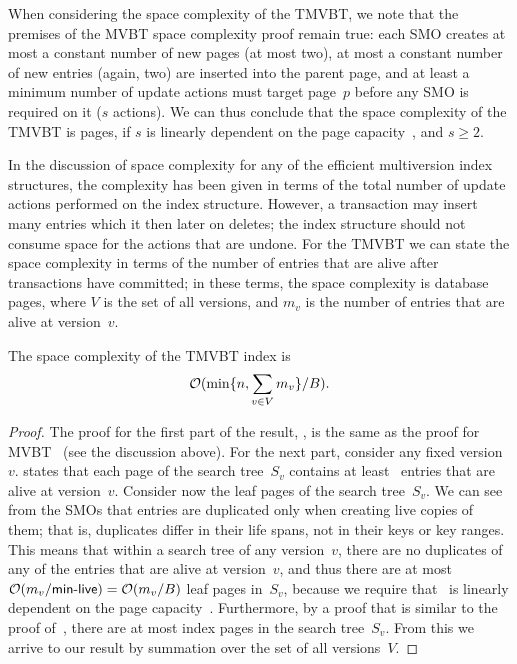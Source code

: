When considering the space complexity of the TMVBT, we note that the premises
of the MVBT space complexity proof remain true: 
each SMO creates at most a constant number of new pages (at most two), 
at most a constant number of new entries (again, two) are inserted into the
parent page, and 
at least a minimum number of update actions must target page~$p$ before any
SMO is required on it ($s$ actions).
We can thus conclude that the space complexity of the TMVBT is 
 pages, if $s$ is linearly dependent on the page
capacity~\capacity, and $s \geq 2$.

In the discussion of space complexity for any of the efficient
multiversion index structures, the complexity has been given in terms of the
total number of update actions performed on the index structure. 
However, a transaction may insert many entries which it then later on deletes;
the index structure should not consume space for the actions that are undone.
For the TMVBT we can state the space complexity in terms of the number of
entries that are alive after transactions have committed; in these terms, the
space complexity is  database pages,
where $V$ is the set of all versions, and $m_v$ is the number of entries that are
alive at version~$v$.

\thmskip
\begin{theorem}
The space complexity of the TMVBT index is \[\mathcal{O}(\min \{ n, \sum_{v
\in V} m_v \} / B).\]
\end{theorem}
\begin{proof}
The proof for the first part of the result, , is the same as the
proof for MVBT~\cite{becker:1993:optimal,becker:1996:mvbt} (see the discussion
above). 
For the next part, consider any fixed version~$v$.
 states that each page of the search
tree~$S_v$ contains at least \minlive\ entries that are alive at version~$v$. 
Consider now the leaf pages of the search tree~$S_v$. 
We can see from the SMOs that entries are duplicated only when creating live
copies of them; that is, duplicates differ in their life spans, not in their
keys or key ranges.
This means that within a search tree of any version~$v$, there are no
duplicates of any of the entries that are alive at version~$v$, and thus there
are at most $\mathcal{O}(m_v/\text{\textsf{min-live}}) = \mathcal{O}(m_v/B)$ leaf pages in~$S_v$,
because we require that \minlive\ is linearly dependent on the page
capacity~\capacity. 
Furthermore, by a proof that is similar to the proof
of~, there are at most 
index pages in the search tree~$S_v$. 
From this we arrive to our result by summation over the set of all
versions~$V$.
\end{proof}
\thmskip

